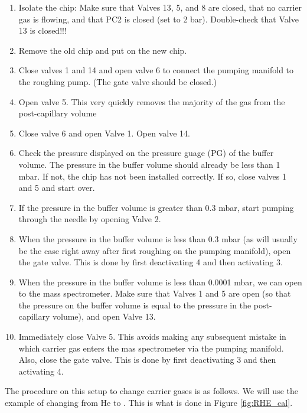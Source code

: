 \begin{enumerate}
	\item Isolate the chip: Make sure that Valves 13, 5, and 8 are closed, that no carrier gas is flowing, and that PC2 is closed (set to 2 bar). Double-check that Valve 13 is closed!!!
	
	\item Remove the old chip and put on the new chip.
	
	\item Close valves 1 and 14 and open valve 6 to connect the pumping manifold to the roughing pump. (The gate valve should be closed.)
	
	\item Open valve 5. This very quickly removes the majority of the gas from the post-capillary volume
	
	\item Close valve 6 and open Valve 1. Open valve 14.  
	
	\item Check the pressure displayed on the pressure guage (PG) of the buffer volume. The pressure in the buffer volume should already be less than 1 mbar. If not, the chip has not been installed correctly. If so, close valves 1 and 5 and start over.
	
	\item If the pressure in the buffer volume is greater than 0.3 mbar, start pumping through the needle by opening Valve 2.
	
	\item When the pressure in the buffer volume is less than 0.3 mbar (as will usually be the case right away after first roughing on the pumping manifold), open the gate valve. This is done by first deactivating 4 and then activating 3.
	
	\item When the pressure in the buffer volume is less than 0.0001 mbar, we can open to the mass spectrometer. Make sure that Valves 1 and 5 are open (so that the pressure on the buffer volume is equal to the pressure in the post-capillary volume), and open Valve 13.
	
	\item Immediately close Valve 5. This avoids making any subsequent mistake in which carrier gas enters the mas spectrometer via the pumping manifold. Also, close the gate valve. This is done by first deactivating 3 and then activating 4.
\end{enumerate}

The procedure on this setup to change carrier gases is as follows. We will use the example of changing from He to . This is what is done in Figure \ref{fig:RHE_cal}.

